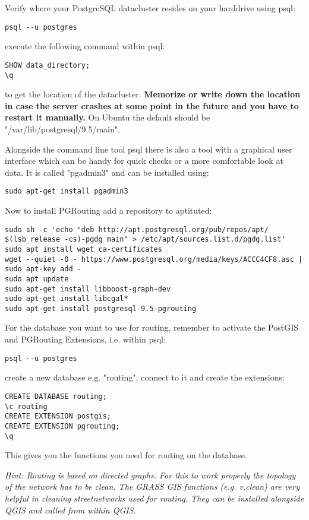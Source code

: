 \documentclass{article}
\begin{document}
Verify where your PostgreSQL datacluster resides on your harddrive
using psql:
\begin{verbatim}
psql --u postgres
\end{verbatim}
execute the following command within psql:
\begin{verbatim}
SHOW data_directory;
\q
\end{verbatim}
to get the location of the datacluster. \textbf{Memorize or write down the location in case the server crashes at some point in the future 
and you have to restart it manually.}
On Ubuntu the default should be "/var/lib/postgresql/9.5/main".

Alongside the command line tool psql there is also a tool
with a graphical user interface which can be handy for
quick checks or a more comfortable look at data.
It is called "pgadmin3" and can be installed using:
\begin{verbatim}
sudo apt-get install pgadmin3
\end{verbatim}


Now to install PGRouting add a repository to aptituted:
\begin{verbatim}
sudo sh -c 'echo "deb http://apt.postgresql.org/pub/repos/apt/ $(lsb_release -cs)-pgdg main" > /etc/apt/sources.list.d/pgdg.list'
sudo apt install wget ca-certificates
wget --quiet -O - https://www.postgresql.org/media/keys/ACCC4CF8.asc | sudo apt-key add -
sudo apt update
sudo apt-get install libboost-graph-dev
sudo apt-get install libcgal*
sudo apt-get install postgresql-9.5-pgrouting
\end{verbatim}

For the database you want to use for routing, remember to activate
the PostGIS and PGRouting Extensions, i.e. within psql:
\begin{verbatim}
psql --u postgres
\end{verbatim}
create a new database e.g. "routing", 
connect to it and create the extensions:
\begin{verbatim}
CREATE DATABASE routing;
\c routing
CREATE EXTENSION postgis;
CREATE EXTENSION pgrouting;
\q
\end{verbatim}
This gives you the functions you need for routing on the database.

\textit{Hint: Routing is based on directed graphs. For this
to work properly the topology of the network has to be clean.
The GRASS GIS functions (e.g. v.clean) are very helpful in cleaning
streetnetworks used for routing. They can be installed alongside
QGIS and called from within QGIS.}
\end{document}
